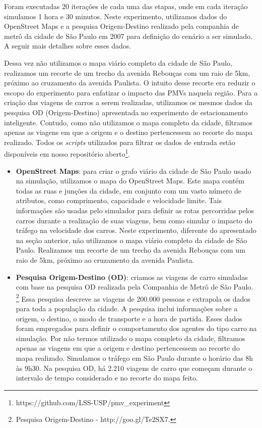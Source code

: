 Foram executadas 20 iterações de cada uma das etapas, onde em cada iteração simulamos 1 hora e 30 minutos.
Neste experimento, utilizamos dados do OpenStreet Maps e a pesquisa Origem-Destino realizado pela companhia de metrô da cidade de São Paulo em 2007 para definição do cenário a ser simulado.
A seguir mais detalhes sobre esses dados.

Dessa vez não utilizamos o mapa viário completo da cidade de São Paulo, realizamos um recorte de um trecho da avenida Rebouças com um raio de 5km, próximo ao cruzamento da avenida Paulista.
O intuito desse recorte era reduzir o escopo do experimento para enfatizar o impacto das PMVs naquela região.
Para a criação das viagens de carros a serem realizadas, utilizamos os mesmos dados da pesquisa OD (Origem-Destino) apresentada no experimento de estacionamento inteligente.
Contudo, como não utilizamos o mapa completo da cidade, filtramos apenas as viagens em que a origem e o destino pertencessem ao recorte do mapa realizado.
Todos os \textit{scripts} utilizados para filtrar os dados de entrada estão disponíveis em nosso repositório aberto\footnote{https://github.com/LSS-USP/pmv\_experiment}.

\begin{itemize}
    \item \textbf{OpenStreet Maps}: para criar o grafo viário da cidade de São Paulo usado na simulação, utilizamos o mapa do OpenStreet Maps.
        Este mapa contém todas as ruas e junções da cidade, em conjunto com um vasto número de atributos, como comprimento, capacidade e velocidade limite.
        Tais informações são usadas pelo simulador para definir as rotas percorridas pelos carros durante a realização de suas viagens, bem como simular o impacto do tráfego na velocidade dos carros.
        Neste experimento, diferente do apresentado na seção anterior, não utilizamos o mapa viário completo da cidade de São Paulo.
        Realizamos um recorte de um trecho da avenida Rebouças com um raio de 5km, próximo ao cruzamento da avenida Paulista.

    \item \textbf{Pesquisa Origem-Destino (OD)}: criamos as viagens de carro simuladas com base na pesquisa OD realizada pela Companhia de Metrô de São Paulo.
        \footnote{Pesquisa Origem-Destino - http://goo.gl/Te2SX7.}
        Essa pesquisa descreve as viagens de 200.000 pessoas e extrapola os dados para toda a população da cidade.
        A pesquisa inclui informações sobre a origem, o destino, o modo de transporte e a hora de partida.
        Esses dados foram empregados para definir o comportamento dos agentes do tipo carro na simulação.
        Por não termos utilizado o mapa completo da cidade, filtramos apenas as viagens em que a origem e destino pertencessem ao recorte do mapa realizado.
        Simulamos o tráfego em São Paulo durante o horário das 8h às 9h30.
        Na pesquisa OD, há 2.210 viagens de carro que começam durante o intervalo de tempo considerado e no recorte do mapa feito.
\end{itemize}

